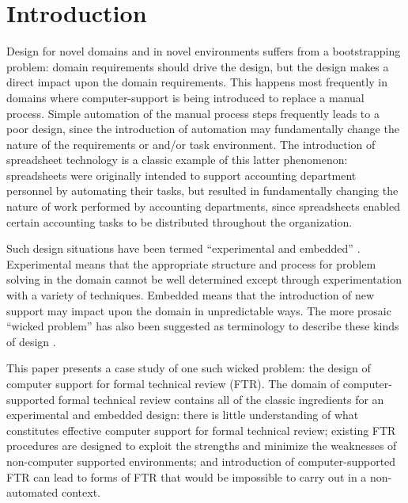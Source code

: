 
\section{Introduction}

Design for novel domains and in novel environments suffers from a
bootstrapping problem: domain requirements should drive the design, but the
design makes a direct impact upon the domain requirements.  This happens
most frequently in domains where computer-support is being introduced to
replace a manual process.  Simple automation of the manual process steps
frequently leads to a poor design, since the introduction of automation may
fundamentally change the nature of the requirements or and/or task
environment.  The introduction of spreadsheet technology is a classic
example of this latter phenomenon: spreadsheets were originally intended to
support accounting department personnel by automating their tasks, but
resulted in fundamentally changing the nature of work performed by
accounting departments, since spreadsheets enabled certain accounting tasks
to be distributed throughout the organization.

Such design situations have been termed ``experimental and embedded''
\cite{Giddings84}.  Experimental means that the appropriate structure and
process for problem solving in the domain cannot be well determined except
through experimentation with a variety of techniques.  Embedded means that
the introduction of new support may impact upon the domain in unpredictable
ways.  The more prosaic ``wicked problem'' has also been suggested as 
terminology to describe these kinds of design \cite{Partridge85}.

This paper presents a case study of one such wicked problem: the design of
computer support for formal technical review (FTR).  The domain of
computer-supported formal technical review contains all of the classic
ingredients for an experimental and embedded design: there is little
understanding of what constitutes effective computer support for formal
technical review; existing FTR procedures are designed to exploit the
strengths and minimize the weaknesses of non-computer supported
environments; and introduction of computer-supported FTR can lead to
forms of FTR that would be impossible to carry out in a non-automated 
context. 


